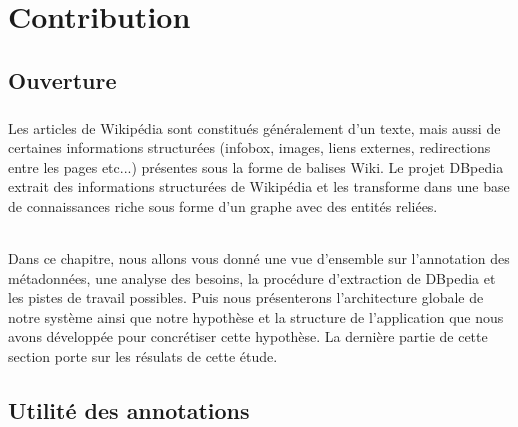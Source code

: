 \chapter{Contribution}
\section{Ouverture}
\paragraph{}
Les articles de Wikipédia sont constitués généralement d'un texte, mais aussi de certaines informations structurées (infobox, images, liens externes, redirections entre les pages etc...) présentes sous la forme de balises Wiki. 
Le projet DBpedia extrait des informations structurées de Wikipédia et les transforme dans une base de connaissances riche sous forme d'un graphe avec des entités reliées.
\subparagraph{}
Dans ce chapitre, nous allons vous donné une vue d'ensemble sur l'annotation des métadonnées, une analyse des besoins, la procédure d'extraction de DBpedia et les pistes de travail possibles. Puis nous présenterons l'architecture globale de notre système ainsi que notre hypothèse et la structure de l'application que nous avons développée pour concrétiser cette hypothèse. La dernière partie de cette section porte sur les résulats de cette étude.
\section{Utilité des annotations}
